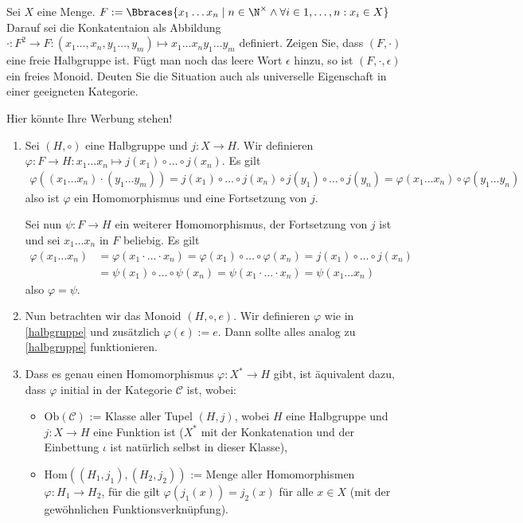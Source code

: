 \begin{exercise}
    Sei $X$ eine Menge. $F := \Bbraces{x_1 \dots x_n \mid n \in \N^\times \land \forall i \in {1, \dots, n}: x_i \in X}$ Darauf sei die Konkatentaion als Abbildung $\cdot: F^2 \to F: (x_1 \dots, x_n, y_1 \dots, y_m) \mapsto x_1 \dots x_n y_1 \dots y_m$ definiert. Zeigen Sie, dass $(F, \cdot)$ eine freie Halbgruppe ist. Fügt man noch das leere Wort $\epsilon$ hinzu, so ist $(F, \cdot, \epsilon)$ ein freies Monoid. Deuten Sie die Situation auch als universelle Eigenschaft in einer geeigneten Kategorie.
\end{exercise}

\begin{solution}
    Hier könnte Ihre Werbung stehen!
    \begin{enumerate}[label = \arabic*)]
        \item \label{halbgruppe} Sei $(H, \circ)$ eine Halbgruppe und $j:X \to H$. Wir definieren $\varphi: F \to H: x_1 \dots x_n \mapsto j(x_1) \circ \dots \circ j(x_n)$. Es gilt
        \begin{align*}
            \varphi((x_1 \dots x_n) \cdot (y_1 \dots y_m)) = j(x_1) \circ \dots \circ j(x_n) \circ j(y_1) \circ \dots \circ j(y_n) = \varphi(x_1 \dots x_n) \circ \varphi(y_1 \dots y_n)
        \end{align*}
        also ist $\varphi$ ein Homomorphismus und eine Fortsetzung von $j$.

        Sei nun $\psi: F \to H$ ein weiterer Homomorphismus, der Fortsetzung von $j$ ist und sei $x_1 \dots x_n$ in $F$ beliebig. Es gilt
        \begin{align*}
            \varphi(x_1 \dots x_n) &= \varphi(x_1 \cdot \dots \cdot x_n) = \varphi(x_1) \circ \dots \circ \varphi(x_n) = j(x_1) \circ \dots \circ j(x_n) \\
            &= \psi(x_1) \circ \dots \circ \psi(x_n) = \psi(x_1 \cdot \dots \cdot x_n) = \psi(x_1 \dots x_n)
        \end{align*}
        also $\varphi = \psi$.
        \item Nun betrachten wir das Monoid $(H, \circ, e)$. Wir definieren $\varphi$ wie in \ref{halbgruppe} und zusätzlich $\varphi(\epsilon) := e$. Dann sollte alles analog zu \ref{halbgruppe} funktionieren.
        \item Dass es genau einen Homomorphismus $\varphi: X^* \rightarrow H$ gibt, ist äquivalent dazu, dass $\varphi$ initial in der Kategorie $\mathcal{C}$ ist, wobei:

\begin{itemize}
    \item $\mathrm{Ob}(\mathcal{C})$ := Klasse aller Tupel $(H, j)$, wobei $H$ eine Halbgruppe und $j: X \rightarrow H$ eine Funktion ist ($X^*$ mit der Konkatenation und der Einbettung $\iota$ ist natürlich selbst in dieser Klasse),
    \item $\mathrm{Hom}((H_1, j_1), (H_2, j_2))$ := Menge aller Homomorphismen $\varphi: H_1 \rightarrow H_2$, für die gilt $\varphi(j_1 (x)) = j_2 (x)$ für alle $x \in X$ (mit der gewöhnlichen Funktionsverknüpfung).
    \end{itemize}
    \end{enumerate}
\end{solution}
